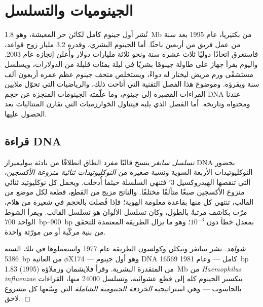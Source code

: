 \chapter{الجينوميات والتسلسل}\label{ch:b3:genomics}

نُشر أول جينوم كامل لكائن حر المعيشة، وهو \qty{1.8}{Mb} من بكتيريا،
عام 1995 بعد سنة من عمل فريق من أربعين باحثًا. أما الجينوم البشري،
وقدره \num{3.2} مليار زوج قواعد، فاستغرق اتحادًا دوليًا ثلاث عشرة سنة
ونحو ثلاثة مليارات دولار وأُعلن إنجازه عام 2003. واليوم يقرأ جهاز
على طاولة جينومًا بشريًا في ليلة بمئات قليلة من الدولارات، ويسلسل
مستشفًى ورم مريض ليختار له دواءً، ويستخلص متحف جينوم عظم عمره أربعون
ألف سنة ويقرؤه. وموضوع هذا الفصل التقنية التي أتاحت ذلك،
والرياضيات التي تحوّل ملايين القراءات القصيرة إلى جينوم، وما علّمته
الجينومات المنجزة عن حجم DNA عندنا ومحتواه وتاريخه. أما الفصل الذي
يليه فيتناول الخوارزميات التي تقارن المتتاليات بعد الحصول عليها.

\section{قراءة DNA}

\begin{definition}\label{def:b3:genomics:sanger}
\emph{تسلسل سانغر} ينسخ قالبًا مفرد الطاق انطلاقًا من بادئة
ببوليميراز DNA بحضور النوكليوتيدات الأربعة السوية ونسبة صغيرة من
\emph{النوكليوتيدات ثنائية منزوعة الأكسجين}، التي تنقصها الهيدروكسيل
3$'$ فتنهي السلسلة حيثما أُدخلت. ويحمل كل نوكليوتيد ثنائي منزوع
الأكسجين صبغًا متألقًا مختلفًا. والناتج مزيج من القطع، قطعة لكل موضع
من القالب، تنتهي كل منها بقاعدة معلومة الهوية؛ فإذا فُصلت بالحجم
في شعيرة من هلام، مرّت بكاشف مرتبةً بالطول، وكان تسلسل الألوان هو
تسلسل القالب. ويقرأ الشوط الواحد \qtyrange{700}{900}{bp} بمعدل خطأ
دون $10^{-3}$؛ وهو ما يزال الطريقة المعتمدة للتحقق من بنية مركّبة أو
من مورّثة واحدة.
\end{definition}

\begin{proof}[شواهد]
نشر سانغر ونيكلن وكولسون الطريقة عام 1977 واستعملوها في تلك السنة
 \qty{5386}{bp} من العاثية $\phi$X174 --- وهو أول
جينوم DNA كامل --- وعام 1981  \qty{16569}{bp} من
المتقدرة البشرية. وقرأ فلايشمان وزملاؤه (1995)
\qty{1.83}{Mb} من \emph{Haemophilus influenzae} بتكسير الجينوم
كله إلى قطع عشوائية، وتسلسل \num{24000} منها،
 القراءات بالحاسوب --- وهي استراتيجية \emph{الخردقة الجينومية
الشاملة} التي وسّعها كل مشروع لاحق.
\end{proof}

